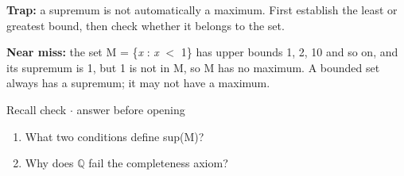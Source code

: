 \documentclass[11pt]{article}
\begin{document}
\begin{keepsection}
\begin{notebox}\textbf{Trap:} a supremum is not automatically a maximum. First establish the least or greatest bound, then check whether it belongs to the set.\end{notebox}

\begin{notebox}\textbf{Near miss:} the set M = \{\textit{x} : \textit{x} \ensuremath{<} 1\} has upper bounds 1, 2, 10 and so on, and its supremum is 1, but 1 is not in M, so M has no maximum. A bounded set always has a supremum; it may not have a maximum.\end{notebox}

\begin{recallbox}{Recall check \ensuremath{\cdot} answer before opening}
\begin{enumerate}
\item What two conditions define sup(M)?
\item Why does \ensuremath{\mathbb{Q}} fail the completeness axiom?
\end{enumerate}

\end{recallbox}
\end{keepsection}
\end{document}
